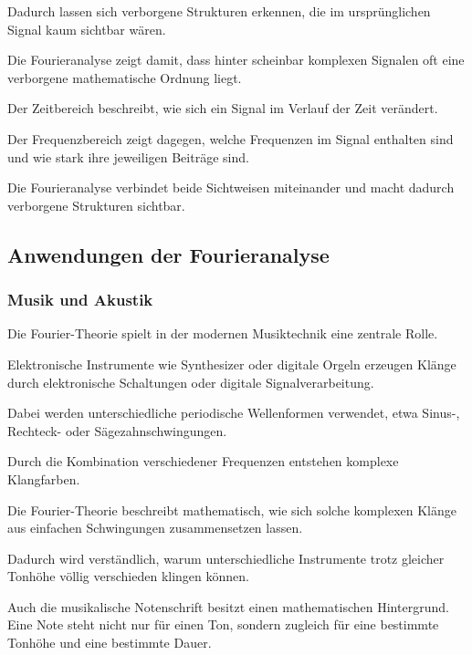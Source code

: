 Dadurch lassen sich verborgene Strukturen erkennen,
die im ursprünglichen Signal kaum sichtbar wären.

Die Fourieranalyse zeigt damit,
dass hinter scheinbar komplexen Signalen
oft eine verborgene mathematische Ordnung liegt.

\begin{NoteBox}
	\small
	\label{box:fourier-zeitbereich-frequenzbereich}
	Der Zeitbereich beschreibt,
	wie sich ein Signal im Verlauf der Zeit verändert.
	
	Der Frequenzbereich zeigt dagegen,
	welche Frequenzen im Signal enthalten sind
	und wie stark ihre jeweiligen Beiträge sind.
	
	Die Fourieranalyse verbindet beide Sichtweisen miteinander
	und macht dadurch verborgene Strukturen sichtbar.
\end{NoteBox}

\subsection{Anwendungen der Fourieranalyse}

\subsubsection*{Musik und Akustik}

Die Fourier-Theorie spielt in der modernen Musiktechnik eine zentrale Rolle.

Elektronische Instrumente wie Synthesizer oder digitale Orgeln
erzeugen Klänge durch elektronische Schaltungen oder digitale Signalverarbeitung.

Dabei werden unterschiedliche periodische Wellenformen verwendet,
etwa Sinus-,
Rechteck-
oder Sägezahnschwingungen.

Durch die Kombination verschiedener Frequenzen
entstehen komplexe Klangfarben.

Die Fourier-Theorie beschreibt mathematisch,
wie sich solche komplexen Klänge
aus einfachen Schwingungen zusammensetzen lassen.

Dadurch wird verständlich,
warum unterschiedliche Instrumente trotz gleicher Tonhöhe
völlig verschieden klingen können.

\medskip

Auch die musikalische Notenschrift besitzt einen mathematischen Hintergrund.
Eine Note steht nicht nur für einen Ton,
sondern zugleich für eine bestimmte Tonhöhe und eine bestimmte Dauer.

